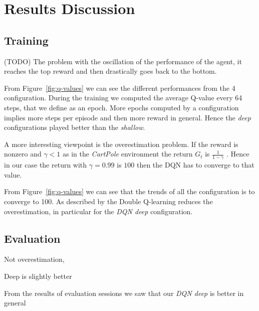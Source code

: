 \section{Results Discussion}

\subsection{Training}

(TODO) The problem with the oscillation of the performance of the agent, it reaches the top reward and then drastically goes back to the bottom.

%

From Figure~\ref{fig:q-values} we can see the different performances from the 4 configuration. During the training we computed the average Q-value every 64 steps, that we define as an epoch. More epochs computed by a configuration implies more steps per episode and then more reward in general. Hence the \textit{deep} configurations played better than the \textit{shallow}.


A more interesting viewpoint is the overestimation problem. If the reward is nonzero and $\gamma < 1$ as in the \textit{CartPole} environment the return $G_t$ is $\frac{1}{1 - \gamma}$ \cite{Sutton:1998:IRL:551283}. Hence in our case the return with $\gamma = 0.99$ is $100$ then the DQN has to converge to that value.

From Figure~\ref{fig:q-values} we can see that the trends of all the configuration is to converge to 100. As described by \citeauthor{Hasselt:2016:DRL:3016100.3016191}  the Double Q-learning reduces the overestimation, in particular for the \textit{DQN deep} configuration.




\subsection{Evaluation}


Not overestimation, 




Deep is slightly better

% 

From the results of evaluation sessions we saw that our \textit{DQN deep} is better in general


